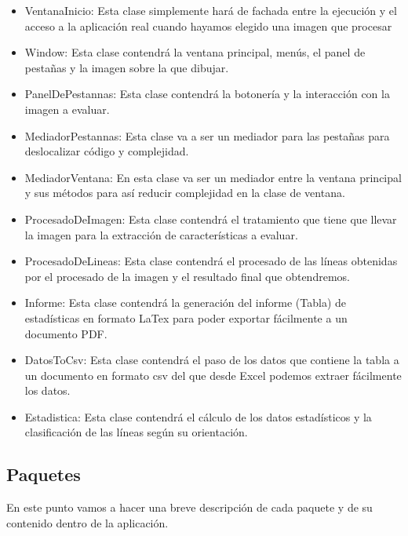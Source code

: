 \begin{itemize}
	\item VentanaInicio: 
Esta clase simplemente hará de fachada entre la ejecución y el acceso a la aplicación real cuando hayamos elegido una imagen que procesar
	\item Window:
Esta clase contendrá la ventana principal, menús, el panel de pestañas y la imagen sobre la que dibujar.
	\item PanelDePestannas:
Esta clase contendrá la botonería y la interacción con la imagen a evaluar.
	\item MediadorPestannas:
Esta clase va a ser un mediador para las pestañas para deslocalizar código y complejidad.
	\item MediadorVentana:
En esta clase va ser un mediador entre la ventana principal y sus métodos para así reducir complejidad en la clase de ventana.
	\item ProcesadoDeImagen:
Esta clase contendrá el tratamiento que tiene que llevar la imagen para la extracción de características a evaluar.
	\item ProcesadoDeLineas:
Esta clase contendrá el procesado de las líneas obtenidas por el procesado de la imagen y el resultado final que obtendremos.
	\item Informe: 
Esta clase contendrá la generación del informe (Tabla) de estadísticas en formato LaTex para poder exportar fácilmente a un documento PDF.
	\item DatosToCsv:
Esta clase contendrá el paso de los datos que contiene la tabla a un documento en formato csv del que desde Excel podemos extraer fácilmente los datos.
	\item Estadistica: 
Esta clase contendrá el cálculo de los datos estadísticos y la clasificación de las líneas según su orientación.
\end{itemize}

\subsection{Paquetes}
En este punto vamos a hacer una breve descripción de cada paquete y de su contenido dentro de la aplicación.

